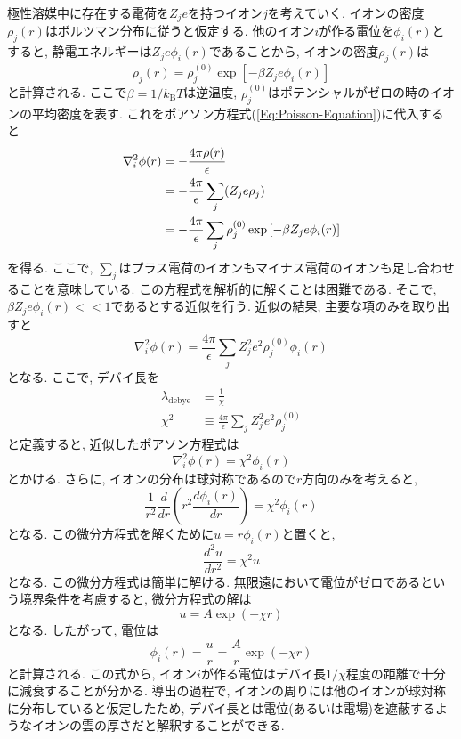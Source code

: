 極性溶媒中に存在する電荷を$Z_{j} e$を持つイオン$j$を考えていく.
イオンの密度$\rho_{j}(r)$はボルツマン分布に従うと仮定する. 
他のイオン$i$が作る電位を$\phi_{i}(r)$とすると, 静電エネルギーは$Z_{j}e \phi_{i}(r)$であることから, イオンの密度$\rho_{j}(r)$は
\begin{equation}
    \rho_{j}(r) =
    \rho_{j}^{(0)} \exp\left[-\beta Z_{j}e \phi_{i}(r)\right]
\end{equation}
と計算される. ここで$\beta = 1/k_{\mathrm{B}}T$は逆温度, $\rho_{j}^{(0)}$はポテンシャルがゼロの時のイオンの平均密度を表す. 
これをポアソン方程式(\ref{Eq:Poisson-Equation})に代入すると
\begin{align}
    \nabla^{2}_{i} \phi(r)
    &=
    - \frac{4\pi\rho(r)}{\epsilon}
    \notag \\
    &=
    - \frac{4\pi}{\epsilon} \sum_{j}(Z_{j} e \rho_{j})
    \notag \\
    &=
    - \frac{4\pi}{\epsilon}
    \sum_{j}
    \rho_{j}^{(0)} \exp\left[-\beta Z_{j}e \phi_{i}(r)\right]
\end{align}
を得る. ここで, $\sum_{j}$はプラス電荷のイオンもマイナス電荷のイオンも足し合わせることを意味している. この方程式を解析的に解くことは困難である. そこで, $\beta Z_{j} e \phi_{i}(r) << 1$であるとする近似を行う. 近似の結果, 主要な項のみを取り出すと
\begin{equation}
    \nabla^{2}_{i} \phi(r)
    =
    \frac{4\pi}{\epsilon}
    \sum_{j} Z_{j}^{2} e^{2} \rho_{j}^{(0)} \phi_{i}(r)
\end{equation}
となる. ここで, デバイ長を
\begin{align}
    \lambda_{\mathrm{debye}} &\equiv \frac{1}{\chi} 
    \\
    \chi^{2} &\equiv 
    \frac{4\pi}{\epsilon}
    \sum_{j} Z_{j}^{2} e^{2} \rho_{j}^{(0)}
\end{align}
と定義すると, 近似したポアソン方程式は
\begin{equation}
    \nabla^{2}_{i} \phi(r) = \chi^{2} \phi_{i}(r)
\end{equation}
とかける. さらに, イオンの分布は球対称であるので$r$方向のみを考えると,
\begin{equation}
    \frac{1}{r^{2}} \frac{d}{dr}
    \left(
        r^{2}
        \frac{d\phi_{i}(r)}{dr}
    \right)
    =
    \chi^{2} \phi_{i}(r)
\end{equation}
となる. この微分方程式を解くために$u = r \phi_{i}(r)$と置くと,
\begin{equation}
    \frac{d^{2} u}{dr^{2}} = \chi^{2} u
\end{equation}
となる. この微分方程式は簡単に解ける.
無限遠において電位がゼロであるという境界条件を考慮すると, 微分方程式の解は
\begin{equation}
    u = A \exp(-\chi r)
\end{equation}
となる. したがって, 電位は
\begin{equation}
    \phi_{i}(r) = \frac{u}{r} = \frac{A}{r} \exp(-\chi r)
\end{equation}
と計算される. この式から, イオン$i$が作る電位はデバイ長$1/\chi$程度の距離で十分に減衰することが分かる. 導出の過程で, イオンの周りには他のイオンが球対称に分布していると仮定したため, デバイ長とは電位(あるいは電場)を遮蔽するようなイオンの雲の厚さだと解釈することができる.

